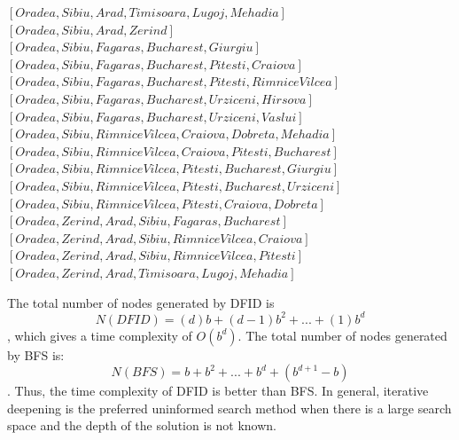 \documentclass{article}%
\begin{document}
\begin{enumerate}
\begin{enumerate}
\begin{itemize}
\begin{itemize}
			$\left[ Oradea, Sibiu, Arad,Timisoara, Lugoj, Mehadia \right]$ \\ 
			$\left[ Oradea, Sibiu, Arad,Zerind \right]$ \\ 
			$ \left[ Oradea, Sibiu, Fagaras, Bucharest, Giurgiu \right]$ \\ 
			$\left[ Oradea, Sibiu, Fagaras, Bucharest, Pitesti, Craiova\right]$ \\ 
			$\left[ Oradea, Sibiu, Fagaras, Bucharest, Pitesti, Rimnice Vilcea\right]$ \\ 
			$ \left[ Oradea, Sibiu, Fagaras, Bucharest, Urziceni, Hirsova\right]$ \\
			$ \left[ Oradea, Sibiu, Fagaras, Bucharest, Urziceni, Vaslui\right]$ \\
			$ \left[ Oradea, Sibiu, Rimnice Vilcea, Craiova,Dobreta,Mehadia \right]$ \\ 
			$ \left[ Oradea, Sibiu, Rimnice Vilcea, Craiova,Pitesti, Bucharest \right]$ \\ 
			$\left[ Oradea, Sibiu, Rimnice Vilcea, Pitesti, Bucharest, Giurgiu \right] $ \\
			$\left[ Oradea, Sibiu, Rimnice Vilcea, Pitesti, Bucharest, Urziceni \right] $ \\
			$\left[ Oradea, Sibiu, Rimnice Vilcea, Pitesti, Craiova, Dobreta \right]$ \\
			$ \left[ Oradea, Zerind, Arad, Sibiu, Fagaras, Bucharest\right]$ \\ 
			$\left[ Oradea, Zerind, Arad, Sibiu, Rimnice Vilcea, Craiova\right]$ \\
			$\left[ Oradea, Zerind, Arad, Sibiu, Rimnice Vilcea, Pitesti\right]$ \\
			$\left[ Oradea, Zerind, Arad, Timisoara, Lugoj,Mehadia\right] $ 
			\end{itemize}
		\end{itemize}
	
		The total number of nodes generated by DFID is 
$$N(DFID) = (d) b + (d - 1)b^2 + . . . + (1) b^d$$, which gives a time complexity of $O(b^d)$. 
	The total number of nodes generated by BFS is:
$$N(BFS) = b + b^2 + . . . + b^d + (b^{d+1} - b)$$ . Thus, the time complexity of DFID is better than BFS. In general, iterative deepening is the preferred uninformed search method when there is a
large search space and the depth of the solution is not known.
	
	\end{enumerate}

\end{enumerate}
\end{document}
